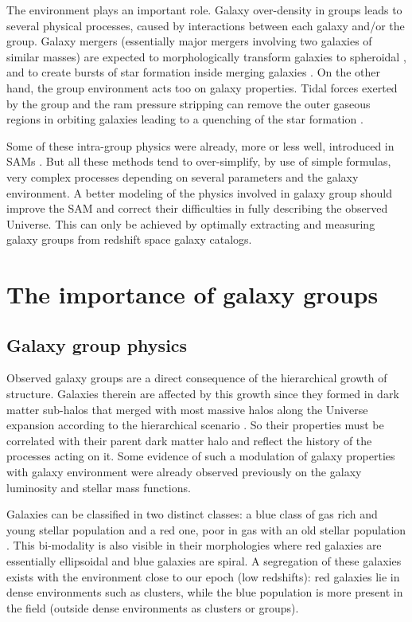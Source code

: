 The environment plays an important role. Galaxy over-density in groups leads to
several physical processes, caused by interactions between each galaxy and/or
the group. Galaxy mergers (essentially major mergers involving two galaxies of
similar masses) are expected to morphologically transform galaxies to
spheroidal \citep{Naab+99,Bournaud+05, Mamon+92}, and to create bursts of star
formation inside merging galaxies \citep{Cox+08,Teyssier+10}. On the other
hand, the group environment acts too on galaxy properties. Tidal forces exerted
by the group and the ram pressure stripping can remove the outer gaseous
regions in orbiting galaxies leading to a quenching of the star formation
\citep{Larson+80,Bekki+14}.

Some of these intra-group physics were already, more or less well, introduced
in SAMs \citep{Okamoto+03,Lanzoni+05,Font+08,Guo+11}. But all these methods
tend to over-simplify, by use of simple formulas, very complex processes
depending on several parameters and the galaxy environment. A better modeling
of the physics involved in galaxy group should improve the SAM and correct
their difficulties in fully describing the observed Universe. This can only be
achieved by optimally extracting and measuring galaxy groups from redshift
space galaxy catalogs.

\section{The importance of galaxy groups}
\label{sec:the_importance_of_galaxy_groups}

\subsection{Galaxy group physics}
\label{sub:galaxy_group_physics}

Observed galaxy groups are a direct consequence of the hierarchical growth of
structure. Galaxies therein are affected by this growth since they formed in
dark matter sub-halos that merged with most massive halos along the Universe
expansion according to the hierarchical scenario \citep{Lacey+93}. So their
properties must be correlated with their parent dark matter halo and reflect
the history of the processes acting on it. Some evidence of such a modulation
of galaxy properties with galaxy environment were already observed previously
on the galaxy luminosity \citep{Robotham+10} and stellar mass \citep{Yang+09}
functions.

Galaxies can be classified in two distinct classes: a blue class of
gas rich and young stellar population and a red one, poor in gas with an old
stellar population \citep{Driver+06}. This bi-modality is also visible in their
morphologies where red galaxies are essentially ellipsoidal and blue galaxies
are spiral. A segregation of these galaxies exists with the environment close
to our epoch (low redshifts): red galaxies lie in dense environments such as
clusters, while the blue population is more present in the field (outside dense
environments as clusters or groups).

